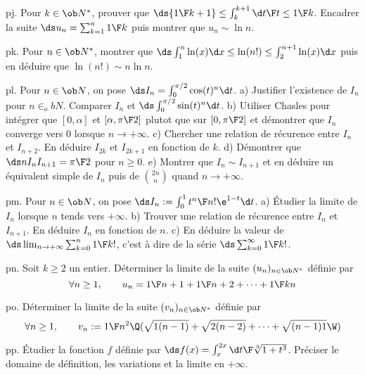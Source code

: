 \exo [Level=1,Fight=1,Learn=1,Field=\Intégration,Type=\Exercices,Origin=] pj. 
Pour $k\in\ob N^*$, prouver que $\ds{1\F k+1}\le \int_k^{k+1}{\d t\F t}\le {1\F k}$. 
Encadrer la suite $\ds u_n=\sum_{k=1}^n{1\F k}$ puis montrer que $u_n\sim \ln n$. 

\exo [Level=1,Fight=2,Learn=2,Field=\Intégration,Type=\Exercices,Origin=,Indication={Commencer par encadrer l'intégrale $\ds\int_k^{k+1}\ln(x)\d x$.} ]  pk. 
Pour $n\in\ob N^*$, montrer que $\ds \int_1^n\ln (x)\d x\le\ln(n!)\le \int_2^{n+1}\ln(x)\d x$ puis en déduire que $\ln(n!)\sim n\ln n$. \pn


\exo [Level=1,Fight=3,Learn=3,Field=\Intégration,Type=\Exercices,Origin=]  pl. 
Pour $n\in\ob N$, on pose $\ds I_n=\int_0^{\pi/2}\cos(t)^n\d t$. \pn
a) Justifier l'existence de $I_n$ pour $n\in_ob N$. Comparer $I_n$ et $\ds \int_0^{\pi/2}\sin(t)^n\d t$. \pn
b) Utiliser Chasles pour intégrer que $[0,\alpha]$ et $[\alpha,{\pi\F2}]$ plutot que sur $[0,{\pi\F 2}]$ et 
démontrer que $I_n$ converge vers $0$ lorsque $n\to+\infty$. \pn
c) Chercher une relation de récurence entre $I_n$ et $I_{n+2}$. En déduire $I_{2k}$ et $I_{2k+1}$ en fonction de $k$. \pn
d) Démontrer que $\ds nI_nI_{n+1}={\pi\F 2}$ pour $n\ge0$. \pn
e) Montrer que $I_n\sim I_{n+1}$ et en déduire un équivalent simple de $I_n$ puis de ${2n \choose n}$ quand $n\to+\infty$. 

\exo [Level=1,Fight=2,Learn=2,Field=\Intégration,Type=\Exercices,Origin=] pm. 
Pour $n\in\ob N$, on pose $\ds I_n:=\int_0^1{t^n\F n!}\e^{1-t}\d t$. \pn
a) Étudier la limite de $I_n$ lorsque $n$ tends vers $+\infty$. \pn
b) Trouver une relation de récurence entre $I_n$ et $I_{n+1}$. En déduire $I_n$ en fonction de $n$. \pn
c) En déduire la valeur de $\ds\lim_{n\to+\infty}\sum_{k=0}^n{1\F k!}$, c'est à dire de la série $\ds\sum_{k=0}^\infty{1\F k!}$. 

\exo [Level=1,Fight=1,Learn=1,Field=\Suites,Type=\Exercices,Origin=] pn. 
Soit $k\ge2$ un entier. Déterminer la limite de la suite $(u_n)_{n\in\ob N^*}$ définie par 
$$
\forall n\ge1, \qquad u_n={1\F n+1}+{1\F n+2}+\cdots+{1\F kn}
$$

\exo [Level=1,Fight=1,Learn=1,Field=\Suites,Type=\Exercices,Origin=] po. 
Déterminer la limite de la suite $(v_n)_{n\in\ob N^*}$ définie par 
$$
\forall n\ge1, \qquad v_n:={1\F n^2}\Q(\sqrt{1(n-1)}+\sqrt{2(n-2)}+\cdots+\sqrt{(n-1)1}\W)
$$

\exo [Level=1,Fight=2,Learn=2,Field=\FonctionsDéfiniesParUneIntégrale,Type=\Exercices,Origin=] pp. 
Étudier la fonction $f$ définie par $\ds f(x)=\int_x^{2x}{\d t\F\root 3\of{1+t^3}}$. \pn
Préciser le domaine de définition, les variations et la limite en $+\infty$. \pn

